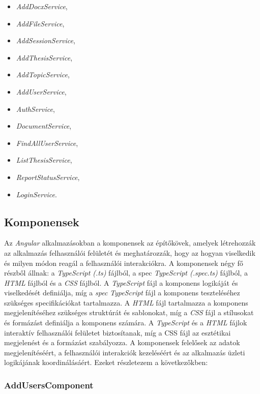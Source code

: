 \begin{itemize}

\item{\textit{AddDocxService}},
\item{\textit{AddFileService}},
\item{\textit{AddSessionService}},
\item{\textit{AddThesisService}},
\item{\textit{AddTopicService}},
\item{\textit{AddUserService}},
\item{\textit{AuthService}},
\item{\textit{DocumentService}},
\item{\textit{FindAllUserService}},
\item{\textit{ListThesisService}},
\item{\textit{ReportStatusService}},
\item{\textit{LoginService}}.

\end{itemize}


\subsection{Komponensek}

Az \textit{Angular} alkalmazásokban a komponensek az építőkövek, amelyek létrehozzák az alkalmazás felhasználói felületét és meghatározzák, hogy az hogyan viselkedik és milyen módon reagál a felhasználói interakciókra. A komponensek négy fő részből állnak: a \textit{TypeScript (.ts)} fájlból, a spec \textit{TypeScript (.spec.ts)} fájlból, a \textit{HTML} fájlból és a \textit{CSS} fájlból. A \textit{TypeScript} fájl a komponens logikáját és viselkedését definiálja, míg a \textit{spec} \textit{TypeScript} fájl a komponens teszteléséhez szükséges specifikációkat tartalmazza. A \textit{HTML} fájl tartalmazza a komponens megjelenítéséhez szükséges struktúrát és sablonokat, míg a \textit{CSS} fájl a stílusokat és formázást definiálja a komponens számára. A \textit{TypeScript} és a \textit{HTML} fájlok interaktív felhasználói felületet biztosítanak, míg a CSS fájl az esztétikai megjelenést és a formázást szabályozza. A komponensek felelősek az adatok megjelenítéséért, a felhasználói interakciók kezeléséért és az alkalmazás üzleti logikájának koordinálásáért. Ezeket részletezem a következőkben:

\subsubsection{AddUsersComponent}

